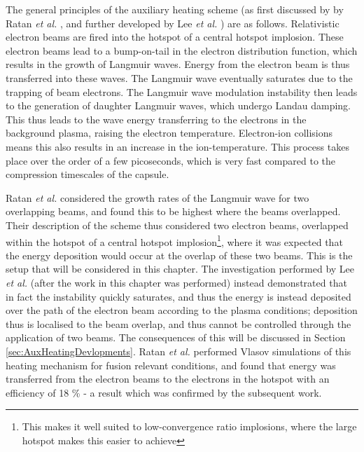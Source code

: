 The general principles of the auxiliary heating scheme (as first discussed by by Ratan \textit{et al.} \cite{Ratan2017}, and further developed by Lee \textit{et al.} \cite{Lee2023}) are as follows. Relativistic electron beams are fired into the hotspot of a central hotspot implosion. These electron beams lead to a bump-on-tail in the electron distribution function, which results in the growth of Langmuir waves. Energy from the electron beam is thus transferred into these waves. The Langmuir wave eventually saturates due to the trapping of beam electrons. The Langmuir wave modulation instability then leads to the generation of daughter Langmuir waves, which undergo Landau damping. This thus leads to the wave energy transferring to the electrons in the background plasma, raising the electron temperature. Electron-ion collisions means this also results in an increase in the ion-temperature. This process takes place over the order of a few picoseconds, which is very fast compared to the compression timescales of the capsule. 

Ratan \textit{et al.} \cite{Ratan2017} considered the growth rates of the Langmuir wave for two overlapping beams, and found this to be highest where the beams overlapped. Their description of the scheme thus considered two electron beams, overlapped within the hotspot of a central hotspot implosion\footnote{This makes it well suited to low-convergence ratio implosions, where the large hotspot makes this easier to achieve}, where it was expected that the energy deposition would occur at the overlap of these two beams. This is the setup that will be considered in this chapter. The investigation performed by Lee \textit{et al.} \cite{Lee2023} (after the work in this chapter was performed) instead demonstrated that in fact the instability quickly saturates, and thus the energy is instead deposited over the path of the electron beam according to the plasma conditions; deposition thus is localised to the beam overlap, and thus cannot be controlled through the application of two beams. The consequences of this will be discussed in Section \ref{sec:AuxHeatingDevlopments}. Ratan \textit{et al.} performed Vlasov simulations of this heating mechanism for fusion relevant conditions, and found that energy was transferred from the electron beams to the electrons in the hotspot with an efficiency of 18 \% - a result which was confirmed by the subsequent work.

